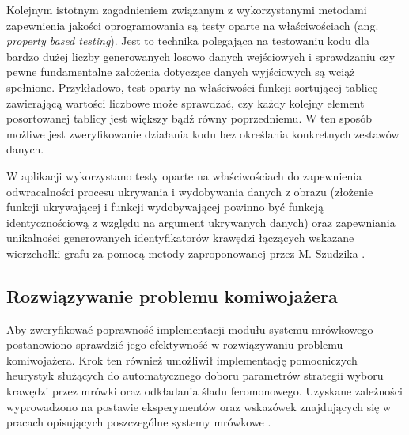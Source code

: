 {{        Kolejnym istotnym zagadnieniem związanym z wykorzystanymi metodami zapewnienia jakości oprogramowania są testy
        oparte na właściwościach (ang. \textit{property based testing}). Jest to technika polegająca na testowaniu kodu
        dla bardzo dużej liczby generowanych losowo danych wejściowych i sprawdzaniu czy pewne fundamentalne założenia
        dotyczące danych wyjściowych są wciąż spełnione. Przykładowo, test oparty na właściwości funkcji sortującej
        tablicę zawierającą wartości liczbowe może sprawdzać, czy każdy kolejny element posortowanej tablicy jest
        większy bądź równy poprzedniemu. W ten sposób możliwe jest zweryfikowanie działania kodu bez określania
        konkretnych zestawów danych.

        W aplikacji wykorzystano testy oparte na właściwościach do zapewnienia odwracalności procesu ukrywania i
        wydobywania danych z obrazu (złożenie funkcji ukrywającej i funkcji wydobywającej powinno być funkcją
        identycznościową z względu na argument ukrywanych danych) oraz zapewniania unikalności generowanych
        identyfikatorów krawędzi łączących wskazane wierzchołki grafu za pomocą metody zaproponowanej przez M. Szudzika
        \cite{SzudzikFn}.

        \subsection{Rozwiązywanie problemu komiwojażera}
        {
            Aby zweryfikować poprawność implementacji modułu systemu mrówkowego postanowiono sprawdzić jego efektywność
            w rozwiązywaniu problemu komiwojażera. Krok ten również umożliwił implementację pomocniczych heurystyk
            służących do automatycznego doboru parametrów strategii wyboru krawędzi przez mrówki oraz odkładania śladu
            feromonowego. Uzyskane zależności wyprowadzono na postawie eksperymentów oraz wskazówek znajdujących się w
            pracach opisujących poszczególne systemy mrówkowe \cite{Dorigo1991AntSA, Dorigo1997AntCS,
            Sttzle2000MAXMINAS}.

}}}
